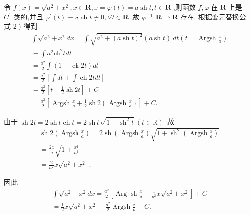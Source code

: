 令 $f\left( x\right)  = \sqrt{{a}^{2} + {x}^{2}},x \in  \mathbf{R},x = \varphi \left( t\right)  = a\operatorname{sh}t,t \in  \mathbf{R}$ ,则函数 $f,\varphi$ 在 $\mathbf{R}$ 上是 ${C}^{1}$ 类的,并且 ${\varphi }^{\prime }\left( t\right)  = a\operatorname{ch}t \neq  0,\forall t \in  \mathbf{R}$ ,故 ${\varphi }^{-1} : \mathbf{R} \rightarrow  \mathbf{R}$ 存在. 根据变元替换公式 2 ) 得到
\begin{align*}
	&\int \sqrt{{a}^{2} + {x}^{2}}{dx} = \int \sqrt{{a}^{2} + {\left( a\operatorname{sh}t\right) }^{2}}{\left( a\operatorname{sh}t\right) }^{\prime }{dt}\left( {t = \operatorname{Argsh}\frac{x}{a}}\right)\\
	&= \int {a}^{2}{\mathrm{{ch}}}^{2}{tdt}\\
	&= \frac{{a}^{2}}{2}\int \left( {1 + \operatorname{ch}{2t}}\right) {dt}\\
	&= \frac{{a}^{2}}{2}\left\lbrack  {\int {dt} + \int \operatorname{ch}{2tdt}}\right\rbrack\\
	&= \frac{{a}^{2}}{2}\left\lbrack  {t + \frac{1}{2}\operatorname{sh}{2t}}\right\rbrack   + C\\
	&= \frac{{a}^{2}}{2}\left\lbrack  {\operatorname{Argsh}\frac{x}{a} + \frac{1}{2}\operatorname{sh}2\left( {\operatorname{Argsh}\frac{x}{a}}\right) }\right\rbrack   + C.
\end{align*}

由于 $\operatorname{sh}{2t} = 2\operatorname{sh}t\operatorname{ch}t = 2\operatorname{sh}t\sqrt{1 + {\operatorname{sh}}^{2}t}\;\left( {t \in  \mathrm{R}}\right)$ ,故
\begin{align*}
	&\operatorname{sh}2\left( {\operatorname{Argsh}\frac{x}{a}}\right)  = 2\operatorname{sh}\left( {\operatorname{Argsh}\frac{x}{a}}\right) \sqrt{1 + {\operatorname{sh}}^{2}\left( {\operatorname{Argsh}\frac{x}{a}}\right) }\\
	&= \frac{2x}{a}\sqrt{1 + \frac{{x}^{2}}{{a}^{2}}}\\
	&= \frac{2}{{a}^{2}}x\sqrt{{a}^{2} + {x}^{2}}\text{ . }
\end{align*}

因此
\begin{align*}
	&\int \sqrt{{a}^{2} + {x}^{2}}{dx} = \frac{{a}^{2}}{2}\left\lbrack  {\operatorname{Arg}\operatorname{sh}\frac{x}{a} + \frac{1}{{a}^{2}}x\sqrt{{a}^{2} + {x}^{2}}}\right\rbrack   + C\\
	&= \frac{1}{2}x\sqrt{{a}^{2} + {x}^{2}} + \frac{{a}^{2}}{2}\operatorname{Argsh}\frac{x}{a} + C.
\end{align*}

